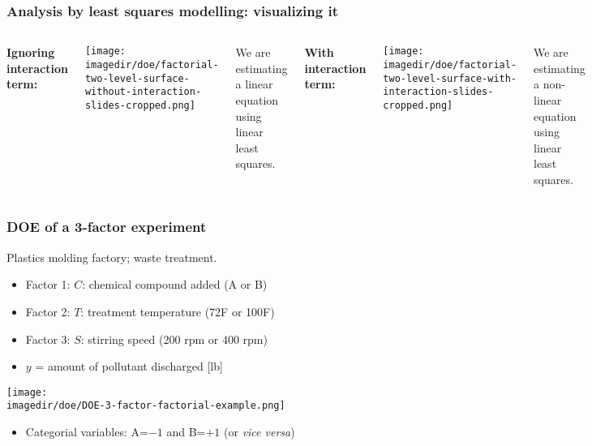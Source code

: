 \begin{frame}\frametitle{Analysis by least squares modelling: visualizing it}
	{\color{myOrange}{High interaction system:}}
	\vspace{12pt}
	\begin{columns}
		\column{5cm} 
			\textbf{Ignoring interaction term:}
			\begin{center}
				\texttt{[image: \\imagedir/doe/factorial-two-level-surface-without-interaction-slides-cropped.png]}
			\end{center}
			We are estimating a linear equation using linear least squares. 
		
		\column{5cm} 
			\textbf{With interaction term:}
			\begin{center}
				\texttt{[image: \\imagedir/doe/factorial-two-level-surface-with-interaction-slides-cropped.png]}
			\end{center}
			We are estimating a non-linear equation using linear least squares.
	\end{columns}
\end{frame}

\begin{frame}\frametitle{DOE of a 3-factor experiment}

	Plastics molding factory; waste treatment.
	\begin{itemize}
		\item	Factor 1: $C$: chemical compound added (A or B)
		\item	Factor 2: $T$: treatment temperature (72F or 100F)
		\item	Factor 3: $S$: stirring speed (200 rpm or 400 rpm)
		\item	$y$ = amount of pollutant discharged [lb]
	\end{itemize}
	\begin{center}
		\texttt{[image: \\imagedir/doe/DOE-3-factor-factorial-example.png]}
	\end{center}
	\begin{itemize}
		\item	Categorial variables: A=$-1$ and B=$+1$ (or \emph{vice versa})
	\end{itemize}
\end{frame}

